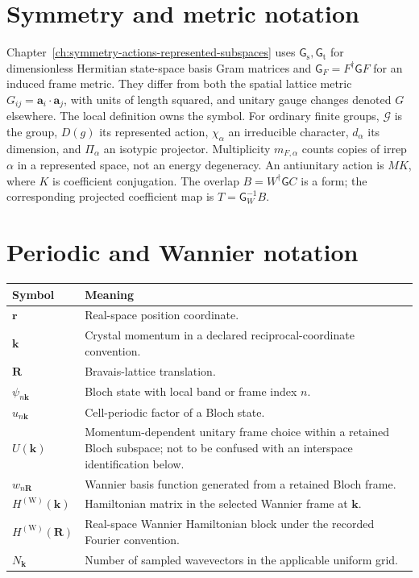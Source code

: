 \section{Symmetry and metric notation}

Chapter~\ref{ch:symmetry-actions-represented-subspaces} uses
$\mathsf G_{\mathrm s},\mathsf G_{\mathrm t}$ for dimensionless Hermitian
state-space basis Gram matrices and $\mathsf G_F=F^{\dagger}\mathsf G F$
for an induced frame metric. They differ from both the spatial lattice metric
$G_{ij}=\mathbf a_i\cdot\mathbf a_j$, with units of length squared, and
unitary gauge changes denoted $G$ elsewhere. The local definition owns the symbol.
For ordinary finite groups, $\mathcal G$ is the group, $D(g)$ its represented
action, $\chi_\alpha$ an irreducible character, $d_\alpha$ its dimension,
and $\Pi_\alpha$ an isotypic projector. Multiplicity $m_{F,\alpha}$ counts
copies of irrep $\alpha$ in a represented space, not an energy degeneracy.
An antiunitary action is $MK$, where $K$ is coefficient conjugation.
The overlap $B=W^{\dagger}\mathsf G C$ is a form; the corresponding
projected coefficient map is $T=\mathsf G_W^{-1}B$.

\section{Periodic and Wannier notation}


\begin{center}
\small
\begin{tabular}{@{}p{}p{}@{}}
\toprule
Symbol & Meaning \\
\midrule
$\mathbf r$ & Real-space position coordinate. \\
$\mathbf k$ & Crystal momentum in a declared reciprocal-coordinate convention. \\
$\mathbf R$ & Bravais-lattice translation. \\
$\psi_{n\mathbf k}$ & Bloch state with local band or frame index $n$. \\
$u_{n\mathbf k}$ & Cell-periodic factor of a Bloch state. \\
$U(\mathbf k)$ & Momentum-dependent unitary frame choice within a retained
Bloch subspace; not to be confused with an interspace identification below. \\
$w_{n\mathbf R}$ & Wannier basis function generated from a retained Bloch frame. \\
$H^{(\mathrm W)}(\mathbf k)$ & Hamiltonian matrix in the selected Wannier
frame at $\mathbf k$. \\
$H^{(\mathrm W)}(\mathbf R)$ & Real-space Wannier Hamiltonian block under the
recorded Fourier convention. \\
$N_{\mathbf k}$ & Number of sampled wavevectors in the applicable uniform grid. \\
\bottomrule
\end{tabular}
\end{center}

